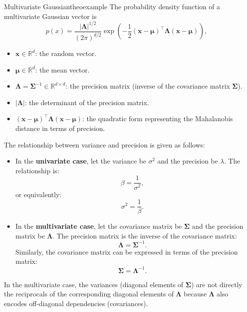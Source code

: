 \documentclass{tufte-handout}
\begin{document}
\begin{mybox}{Multivariate Gaussian}{theoexample}
The probability density function of a multivariate Gaussian vector is
\[
p(x) = \frac{|\mathbf{\Lambda}|^{1/2}}{(2\pi)^{d/2}} \exp\left( -\frac{1}{2} (\mathbf{x} - \boldsymbol{\mu})^\top \mathbf{\Lambda} (\mathbf{x} - \boldsymbol{\mu}) \right),
\]
\begin{itemize}
    \item $\mathbf{x} \in \mathbb{R}^d$: the random vector.
    \item $\boldsymbol{\mu} \in \mathbb{R}^d$: the mean vector.
    \item $\mathbf{\Lambda} = \mathbf{\Sigma}^{-1} \in \mathbb{R}^{d \times d}$: the precision matrix (inverse of the covariance matrix $\mathbf{\Sigma}$).
    \item $|\mathbf{\Lambda}|$: the determinant of the precision matrix.
    \item $(\mathbf{x} - \boldsymbol{\mu})^\top \mathbf{\Lambda} (\mathbf{x} - \boldsymbol{\mu})$: the quadratic form representing the Mahalanobis distance in terms of precision.
\end{itemize}

The relationship between variance and precision is given as follows:

\begin{itemize}
    \item In the \textbf{univariate case}, let the variance be $\sigma^2$ and the precision be $\lambda$. The relationship is:
    \[
    \beta = \frac{1}{\sigma^2},
    \]
    or equivalently:
    \[
    \sigma^2 = \frac{1}{\beta}.
    \]

    \item In the \textbf{multivariate case}, let the covariance matrix be $\mathbf{\Sigma}$ and the precision matrix be $\mathbf{\Lambda}$. The precision matrix is the inverse of the covariance matrix:
    \[
    \mathbf{\Lambda} = \mathbf{\Sigma}^{-1}.
    \]
    Similarly, the covariance matrix can be expressed in terms of the precision matrix:
    \[
    \mathbf{\Sigma} = \mathbf{\Lambda}^{-1}.
    \]
\end{itemize}

In the multivariate case, the variances (diagonal elements of $\mathbf{\Sigma}$) are not directly the reciprocals of the corresponding diagonal elements of $\mathbf{\Lambda}$ because $\mathbf{\Lambda}$ also encodes off-diagonal dependencies (covariances).
\end{mybox}
\end{document}
